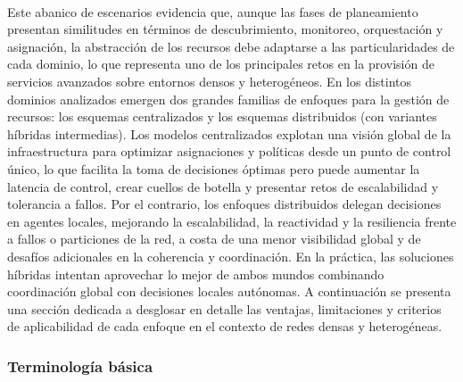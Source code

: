 \\
Este abanico de escenarios evidencia que, aunque las fases de planeamiento presentan similitudes en términos de descubrimiento, monitoreo, orquestación y asignación, la abstracción de los recursos debe adaptarse a las particularidades de cada dominio, lo que representa uno de los principales retos en la provisión de servicios avanzados sobre entornos densos y heterogéneos. En los distintos dominios analizados emergen dos grandes familias de enfoques para la gestión de recursos: los esquemas centralizados y los esquemas distribuidos (con variantes híbridas intermedias). Los modelos centralizados explotan una visión global de la infraestructura para optimizar asignaciones y políticas desde un punto de control único, lo que facilita la toma de decisiones óptimas pero puede aumentar la latencia de control, crear cuellos de botella y presentar retos de escalabilidad y tolerancia a fallos. Por el contrario, los enfoques distribuidos delegan decisiones en agentes locales, mejorando la escalabilidad, la reactividad y la resiliencia frente a fallos o particiones de la red, a costa de una menor visibilidad global y de desafíos adicionales en la coherencia y coordinación. En la práctica, las soluciones híbridas intentan aprovechar lo mejor de ambos mundos combinando coordinación global con decisiones locales autónomas. A continuación se presenta una sección dedicada a desglosar en detalle las ventajas, limitaciones y criterios de aplicabilidad de cada enfoque en el contexto de redes densas y heterogéneas.

\subsubsection{Terminología básica}

